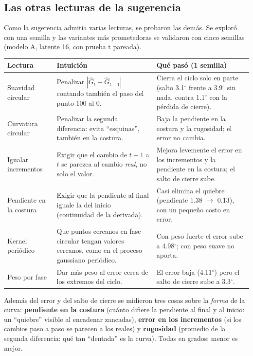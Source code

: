 \documentclass[11pt,a4paper]{article}
\newcommand{\gr}{$^\circ$}
\begin{document}
\subsection{Las otras lecturas de la sugerencia}
\label{sec:otras}

Como la sugerencia admitía varias lecturas, se probaron las demás. Se exploró con una semilla y las variantes más prometedoras se validaron con cinco semillas (modelo A, latente 16, con prueba t pareada).

\begin{center}
\small
\begin{tabularx}{\textwidth}{@{}>{\raggedright\arraybackslash}p{3.1cm}>{\raggedright\arraybackslash}X>{\raggedright\arraybackslash}p{4.4cm}@{}}
\toprule
\textbf{Lectura} & \textbf{Intuición} & \textbf{Qué pasó (1 semilla)} \\
\midrule
Suavidad circular & Penalizar $|\hat G_t-\hat G_{t-1}|$ contando también el paso del punto 100 al 0. & Cierra el ciclo solo en parte (salto 3.1\gr{} frente a 3.9\gr{} sin nada, contra 1.1\gr{} con la pérdida de cierre). \\
Curvatura circular & Penalizar la segunda diferencia: evita ``esquinas'', también en la costura. & Baja la pendiente en la costura y la rugosidad; el error no cambia. \\
Igualar incrementos & Exigir que el cambio de $t-1$ a $t$ se parezca al cambio \emph{real}, no solo el valor. & Mejora levemente el error en los incrementos y la pendiente en la costura; el salto de cierre sube. \\
Pendiente en la costura & Exigir que la pendiente al final iguale la del inicio (continuidad de la derivada). & Casi elimina el quiebre (pendiente 1.38 $\to$ 0.13), con un pequeño costo en error. \\
Kernel periódico & Que puntos cercanos en fase circular tengan valores cercanos, como en el proceso gaussiano periódico. & Con peso fuerte el error sube a 4.98\gr{}; con peso suave no aporta. \\
Peso por fase & Dar más peso al error cerca de los extremos del ciclo. & El error baja (4.11\gr{}) pero el salto de cierre sube a 3.3\gr{}. \\
\bottomrule
\end{tabularx}
\end{center}

\begin{intuicion}
Además del error y del salto de cierre se midieron tres cosas sobre la \emph{forma} de la curva:
\textbf{pendiente en la costura} (cuánto difiere la pendiente al final y al inicio: un ``quiebre'' visible al encadenar zancadas), \textbf{error en los incrementos} (si los cambios paso a paso se parecen a los reales) y \textbf{rugosidad} (promedio de la segunda diferencia: qué tan ``dentada'' es la curva). Todas en grados; menor es mejor.
\end{intuicion}
\end{document}

